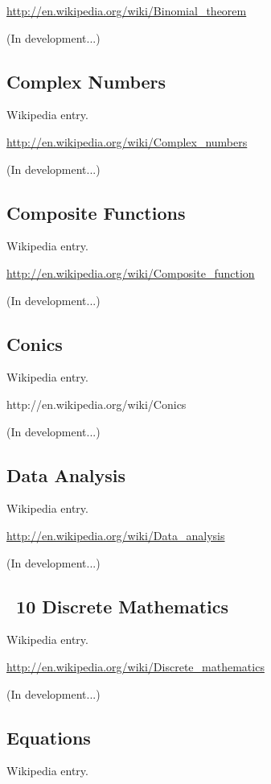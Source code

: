 \documentclass[12pt,twoside]{book}
\begin{document}
\href{http://en.wikipedia.org/wiki/Binomial_theorem}{http://en.wikipedia.org/wiki/Binomial\_theorem}

(In development...)

\subsection[Complex Numbers]{Complex Numbers}
Wikipedia entry.

\href{http://en.wikipedia.org/wiki/Complex_numbers}{http://en.wikipedia.org/wiki/Complex\_numbers}

(In development...)

\subsection[Composite Functions]{Composite Functions}
Wikipedia entry.

\href{http://en.wikipedia.org/wiki/Composite_function}{http://en.wikipedia.org/wiki/Composite\_function}

(In development...)

\subsection[Conics]{Conics}
Wikipedia entry.

http://en.wikipedia.org/wiki/Conics

(In development...)

\subsection[Data Analysis]{Data Analysis}
Wikipedia entry.

\href{http://en.wikipedia.org/wiki/Data_analysis}{http://en.wikipedia.org/wiki/Data\_analysis}

(In development...)

\subsection[\ 10 Discrete Mathematics]{\ 10 Discrete Mathematics}
Wikipedia entry.

\href{http://en.wikipedia.org/wiki/Discrete_mathematics}{http://en.wikipedia.org/wiki/Discrete\_mathematics}

(In development...)

\subsection[Equations]{Equations}
Wikipedia entry.
\end{document}

